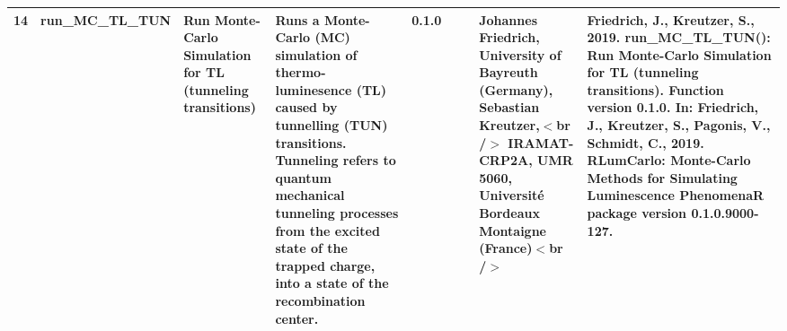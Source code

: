 \begin{table}[ht]
\begin{tabular}{rllllllll}
 \\ 
  14 & run\_MC\_TL\_TUN & Run Monte-Carlo Simulation for TL (tunneling transitions) & Runs a Monte-Carlo (MC) simulation of thermo-luminesence (TL) caused by tunnelling (TUN) transitions.  Tunneling refers to quantum mechanical tunneling processes from the excited state of the trapped charge, into a state of the recombination center. & 0.1.0
 &  &  & Johannes Friedrich, University of Bayreuth (Germany), Sebastian Kreutzer,$<$br /$>$ IRAMAT-CRP2A, UMR 5060, Université Bordeaux Montaigne (France)$<$br /$>$ & Friedrich, J., Kreutzer, S., 2019. run\_MC\_TL\_TUN(): Run Monte-Carlo Simulation for TL (tunneling transitions). Function version 0.1.0. In: Friedrich, J., Kreutzer, S., Pagonis, V., Schmidt, C., 2019. RLumCarlo: Monte-Carlo Methods for Simulating Luminescence PhenomenaR package version 0.1.0.9000-127. 
 \\ 
   \hline
\end{tabular}
\end{table}

